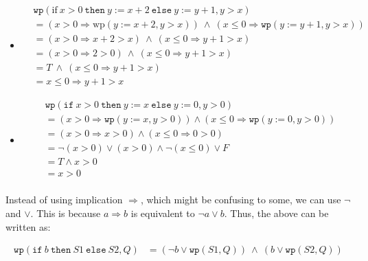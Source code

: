 \documentclass[oneside,11pt,dvipsnames]{book}
\renewcommand{\implies}{\Rightarrow}
\newcommand{\code}[1]{\texttt{#1}}
\begin{document}
\begin{itemize}
    \item
\begin{equation*}
\begin{split}
& \code{wp}(\text{if} ~x > 0~ \code{then} ~y := x + 2 ~\code{else} ~y := y + 1,  y > x)  \\
& = (x > 0 \implies \text{wp}(y := x + 2, y > x)) ~\land~ (x\le 0 \implies \code{wp}(y := y + 1, y > x))\\
& = (x > 0 \implies x + 2 > x)  ~\land~  (x \le 0 \implies y + 1 > x)\\
& = (x > 0 \implies 2 > 0)      ~\land~  (x \le 0 \implies y + 1 > x)\\
& =     T           ~\land~  (x \le 0 \implies y + 1 > x)\\
& =            x \le 0 \implies y + 1 > x
\end{split}
\end{equation*}
    \item
\begin{equation*}
\begin{split}
& \code{wp}(\code{if} ~x > 0~ \code{then} ~y := x~  \code{else} ~y:= 0,  y > 0)\\
& = (x>0 \implies \code{wp}(y:=x, y >0)) \land (x\le 0 \implies \code{wp}(y:=0, y>0))\\
& = (x > 0 \implies x > 0)      \land  (x \le 0  \implies  0 > 0)\\
& = \neg(x > 0) \lor (x > 0)   \land  \neg(x \le 0) \lor F\\
& =       T         \land         x > 0   \\
& =                    x > 0\\  
\end{split}
\end{equation*}
\end{itemize}

Instead of using implication $\implies$, which might be confusing to some, we can use $\neg$ and $\lor$. This is because $a \implies b$ is equivalent to $\neg a \lor b$. Thus, the above can be written as:

\begin{equation}\label{eq:wp-conditional2}
    \begin{split}
        \code{wp}(\code{if}~b~\code{then}~S1~\code{else}~S2, Q)  &=  (\neg b \lor \code{wp}(S1,Q))  ~\land~  (b \lor \code{wp}(S2, Q))    
    \end{split}
\end{equation}
\end{document}
